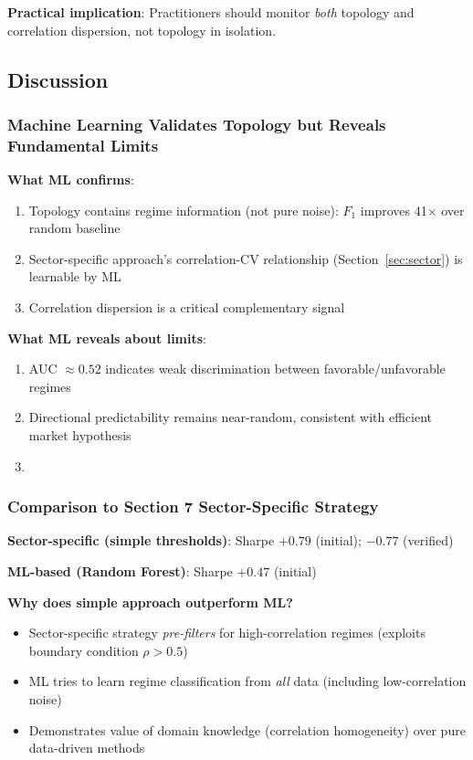 \textbf{Practical implication}: Practitioners should monitor \textit{both} topology and correlation dispersion, not topology in isolation.

\subsection{Discussion}

\subsubsection{Machine Learning Validates Topology but Reveals Fundamental Limits}

\textbf{What ML confirms}:
\begin{enumerate}
    \item Topology contains regime information (not pure noise): $F_1$ improves 41$\times$ over random baseline
    \item Sector-specific approach's correlation-CV relationship (Section~\ref{sec:sector}) is learnable by ML
    \item Correlation dispersion is a critical complementary signal
\end{enumerate}

\textbf{What ML reveals about limits}:
\begin{enumerate}
    \item AUC $\approx 0.52$ indicates weak discrimination between favorable/unfavorable regimes
    \item Directional predictability remains near-random, consistent with efficient market hypothesis
    \item \mlguardrail{}
\end{enumerate}

\subsubsection{Comparison to Section 7 Sector-Specific Strategy}

\textbf{Sector-specific (simple thresholds)}: Sharpe $+0.79$ (initial); $-0.77$ (verified)

\textbf{ML-based (Random Forest)}: Sharpe $+0.47$ (initial)

\textbf{Why does simple approach outperform ML?}
\begin{itemize}
    \item Sector-specific strategy \textit{pre-filters} for high-correlation regimes (exploits boundary condition $\rho > 0.5$)
    \item ML tries to learn regime classification from \textit{all} data (including low-correlation noise)
    \item Demonstrates value of domain knowledge (correlation homogeneity) over pure data-driven methods
\end{itemize}

